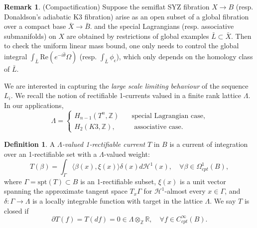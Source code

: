 \documentclass{article}
\theoremstyle{definition}
\newtheorem{rmk}{Remark}
\newtheorem{Def}[thm]{Definition}
\newcommand{\R}{\mathbb{R}}
\newcommand{\Z}{\mathbb{Z}}
\begin{document}
		
		
		\begin{rmk}
			(Compactification)
		Suppose the semiflat SYZ fibration $X\to B$ (resp. Donaldson's adiabatic K3 fibration) 
		arise as an open subset of a global fibration over a compact base $\bar{X}\to \bar{B}$. 
		 and the special Lagrangians (resp. associative submanifolds) on $X$ are obtained by restrictions of global examples $\bar{L}\subset \bar{X}$. Then to check the uniform linear mass bound, one only needs to control the global integral $\int_{\bar{L}} \text{Re}(e^{-i\hat{\theta}} \Omega)$ (resp.  $ \int_{\bar{L} }\phi_\epsilon$), which only depends on the homology class of $\bar{L}$. 
		\end{rmk}
		
		
		
		
		
		
		
		
		
		We are interested in capturing the \emph{large scale limiting behaviour} of the sequence $L_i$. We recall the notion of  rectifiable 1-currents valued in a finite rank lattice $\Lambda$. In our applications, 
		\[
		\Lambda= 
		\begin{cases}
			H_{n-1}(T^n,\Z)\quad &\text{special Lagrangian case},
			\\
			 H_2(K3,\Z),\quad & \text{ associative case}.
		\end{cases}
		\]
		
		
		
		
		
		

		
		
		
		\begin{Def}\label{Def:Lambdavaluedcurrent}
		A \emph{$\Lambda$-valued 1-rectifiable current} $T$ in $B$ is a current of integration over an 1-rectifiable set with a $\Lambda$-valued weight: 
		\begin{equation}
		T(\beta)= \int_\Gamma  \langle \beta(x), \xi(x)\rangle  \delta(x) d\mathcal{H}^1(x),\quad \forall \beta \in \Omega^1_{cpt}(B),
		\end{equation}
		where $\Gamma= \text{spt}(T)\subset B$  is an 1-rectifiable subset,
		$\xi(x)$ is a unit vector spanning the approximate tangent space $T_x \Gamma$ 
	 for $\mathcal{H}^1$-almost every $x\in \Gamma$, and $\delta: \Gamma\to \Lambda$ is a locally integrable function with target in the  lattice $\Lambda$. We say $T$ is closed if 
	 \[
	\partial T(f)= T(df)= 0\in \Lambda\otimes_\Z \R, \quad \forall f\in C^\infty_{cpt}(B).
	 \]

	
		\end{Def}
		
\end{document}

